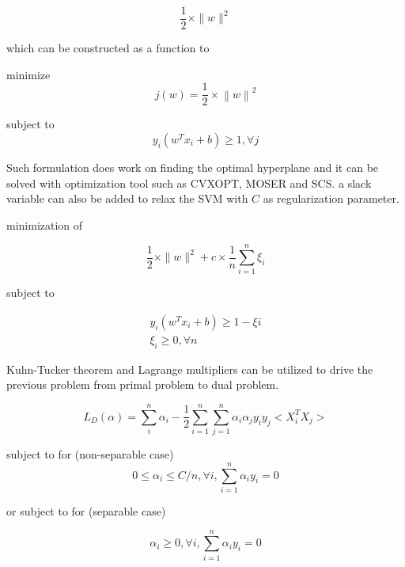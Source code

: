 \documentclass[10pt,twocolumn,letterpaper]{article}
\begin{document}
\begin{equation}
\frac{1}{2} \times\|w\|^{2}
\end{equation}


which can be constructed as a function to 

minimize 
\begin{equation}
j\left( w\right) =\dfrac{1}{2}\times \left\| w\right\| ^{2}
\end{equation}

subject to 
\begin{equation}
y_{i}\left( w^{T}x_{i}+b\right) \geq 1 , \forall j
\end{equation}

Such formulation does work on finding the optimal hyperplane and it can be solved with  optimization tool such as CVXOPT, MOSER and SCS. a slack variable can also be added to relax the SVM with $C$ as regularization parameter. 

minimization of 

\begin{equation}
\frac{1}{2} \times\|w\|^{2}+c\times \dfrac{1}{n}\sum ^{n}_{i=1}\xi _{i}
\end{equation}

subject to 

\begin{equation}
\begin{aligned}y_{i}\left( w^{T}x_{i}+b\right) \geq 1-\xi i\\
\xi _{i}\geq 0,\forall n\end{aligned}
\end{equation}


Kuhn-Tucker theorem and Lagrange multipliers can be utilized to drive the previous problem from primal problem to dual problem. 

\begin{equation}
L_{D}\left( \alpha \right) =\sum ^{n}_{i}\alpha _{i}-\dfrac{1}{2}\sum ^{n}_{i=1}\sum ^{n}_{j=1}\alpha _{i}\alpha _{j}y_{i}y_{j} <X_{i}^{T}X_{j} >
\label{eqn:l}
\end{equation}

subject to for (non-separable case)
\begin{equation}
0 \leq \alpha_{i} \leq C/n , \forall i,\sum ^{n}_{i=1}\alpha _{i}y_{i}=0
\end{equation}

or subject to for (separable case)

\begin{equation}
\alpha_{i} \geq 0 , \forall i,\sum ^{n}_{i=1}\alpha _{i}y_{i}=0
\end{equation}
\end{document}
